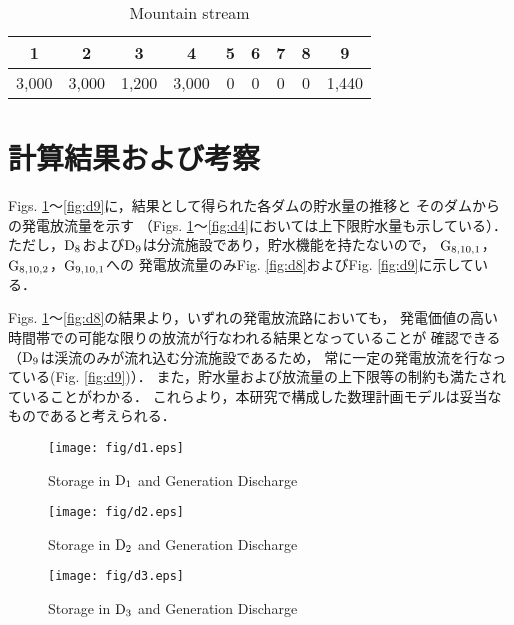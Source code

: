 \begin{table}[htbp]
\begin{center}
\caption{Mountain stream}
\label{stream}
\begin{tabular}{ccccccccc}
\hline
1 & 2 & 3 & 4 & 5 & 6 & 7 & 8 & 9\\
\hline
\hline
3,000 & 3,000 & 1,200 & 3,000 & 0 & 0 & 0 & 0 & 1,440\\
\hline
\end{tabular}
\end{center}
\end{table}


\newpage
\section{計算結果および考察}


Figs. \ref{fig:d1}〜\ref{fig:d9}に，結果として得られた各ダムの貯水量の推移と
そのダムからの発電放流量を示す%
（Figs. \ref{fig:d1}〜\ref{fig:d4}においては上下限貯水量も示している）．
ただし，$\rm D_{8}$および$\rm D_{9}$は分流施設であり，貯水機能を持たないので，%
$\rm G_{8,10,1}$，$\rm G_{8,10,2}$，$\rm G_{9,10,1}$への%
発電放流量のみFig. \ref{fig:d8}およびFig. \ref{fig:d9}に示している．

Figs. \ref{fig:d1}〜\ref{fig:d8}の結果より，いずれの発電放流路においても，%
発電価値の高い時間帯での可能な限りの放流が行なわれる結果となっていることが
確認できる（$\rm D_{9}$は渓流のみが流れ込む分流施設であるため，%
常に一定の発電放流を行なっている(Fig. \ref{fig:d9})）．
また，貯水量および放流量の上下限等の制約も満たされていることがわかる．
これらより，本研究で構成した数理計画モデルは妥当なものであると考えられる．

\begin{figure}[H]
  \centering
  \texttt{[image: fig/d1.eps]}
  \caption{Storage in $\rm D_{1}$ and Generation Discharge}
  \label{fig:d1}
\end{figure}

\begin{figure}[H]
  \centering
  \texttt{[image: fig/d2.eps]}
  \caption{Storage in $\rm D_{2}$ and Generation Discharge }
  \label{fig:d2}
\end{figure}

\begin{figure}[H]
  \centering
  \texttt{[image: fig/d3.eps]}
  \caption{Storage in $\rm D_{3}$ and Generation Discharge }
  \label{fig:d3}
\end{figure}

